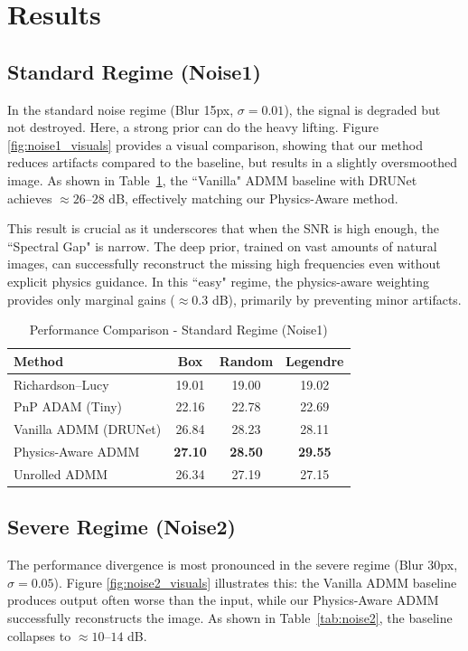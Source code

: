 \documentclass[10pt,journal,compsoc]{IEEEtran}
\begin{document}
\section{Results}

\subsection{Standard Regime (Noise1)}
In the standard noise regime (Blur 15px, $\sigma=0.01$), the signal is degraded but not destroyed. Here, a strong prior can do the heavy lifting. Figure \ref{fig:noise1_visuals} provides a visual comparison, showing that our method reduces artifacts compared to the baseline, but results in a slightly oversmoothed image. As shown in Table~\ref{tab:noise1}, the ``Vanilla" ADMM baseline with DRUNet achieves $\approx 26\text{--}28$ dB, effectively matching our Physics-Aware method.

This result is crucial as it underscores that when the SNR is high enough, the ``Spectral Gap" is narrow. The deep prior, trained on vast amounts of natural images, can successfully reconstruct the missing high frequencies even without explicit physics guidance. In this ``easy" regime, the physics-aware weighting provides only marginal gains ($\approx 0.3$ dB), primarily by preventing minor artifacts.

\begin{table}[h]
\caption{Performance Comparison - Standard Regime (Noise1)}
\label{tab:noise1}
\centering
\begin{tabular}{l|c|c|c}
\hline
Method & Box & Random & Legendre \\
\hline
Richardson--Lucy & 19.01 & 19.00 & 19.02 \\
PnP ADAM (Tiny) & 22.16 & 22.78 & 22.69 \\
Vanilla ADMM (DRUNet) & 26.84 & 28.23 & 28.11 \\
Physics-Aware ADMM & \textbf{27.10} & \textbf{28.50} & \textbf{29.55} \\
Unrolled ADMM & 26.34 & 27.19 & 27.15 \\
\hline
\end{tabular}
\end{table}

\subsection{Severe Regime (Noise2)}
The performance divergence is most pronounced in the severe regime (Blur 30px, $\sigma=0.05$). Figure \ref{fig:noise2_visuals} illustrates this: the Vanilla ADMM baseline produces output often worse than the input, while our Physics-Aware ADMM successfully reconstructs the image. As shown in Table~\ref{tab:noise2}, the baseline collapses to $\approx 10\text{--}14$ dB.
\end{document}
